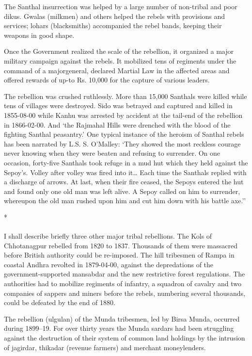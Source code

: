 \begin{multicols}{2}
The Santhal insurrection was helped by a large number of non-tribal and poor dikus. Gwalas (milkmen) and others helped the rebels with provisions and services; lohars (blacksmiths) accompanied the rebel bands, keeping their weapons in good shape.

Once the Government realized the scale of the rebellion, it organized a major military campaign against the rebels. It mobilized tens of regiments under the command of a major­general, declared Martial Law in the affected areas and offered rewards of up-to Rs. 10,000 for the capture of various leaders.

The rebellion was crushed ruthlessly. More than 15,000 Santhals were killed while tens of villages were destroyed. Sido was betrayed and captured and killed in 1855-08-00 while Kanhu was arrested by accident at the tail-end of the rebellion in 1866-02-00. And `the Rajmahal Hills were drenched with the blood of the fighting Santhal peasantry.' One typical instance of the heroism of Santhal rebels has been narrated by L.S. S. O'Malley: `They showed the most reckless courage never knowing when they were beaten and refusing to surrender. On one occasion, forty-five Santhals took refuge in a mud hut which they held against the Sepoy's. Volley after volley was fired into it… Each time the Santhals replied with a discharge of arrows. At last, when their fire ceased, the Sepoys entered the hut and found only one old man was left alive. A Sepoy called on him to surrender, whereupon the old man rushed upon him and cut him down with his battle axe.''

\begin{center}*\end{center}

\paragraph*{}
I shall describe briefly three other major tribal rebellions. The Kols of Chhotanagpur rebelled from 1820 to 1837. Thousands of them were massacred before British authority could be re-imposed. The hill tribesmen of Rampa in coastal Andhra revolted in 1879-04-00, against the depredations of the government-supported mansabdar and the new restrictive forest regulations. The authorities had to mobilize regiments of infantry, a squadron of cavalry and two companies of sappers and miners before the rebels, numbering several thousands, could be defeated by the end of 1880.

The rebellion (ulgulan) of the Munda tribesmen, led by Birsa Munda, occurred during 1899--19. For over thirty years the Munda sardars had been struggling against the destruction of their system of common land holdings by the intrusion of jagirdar, thikadar (revenue farmers) and merchant moneylenders.


\end{multicols}
